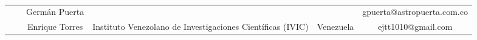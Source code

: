\begin{table}[H]
{\begin{tabular}{cccccc}
\multicolumn{1}{c|}{} & \multicolumn{1}{c|}{} & \multicolumn{1}{c|}{Germán Puerta} & \multicolumn{1}{c|}{} & \multicolumn{1}{c|}{} & \multicolumn{1}{c|}{gpuerta@astropuerta.com.co} \\ \cline{3-6} 
\multicolumn{1}{c|}{} & \multicolumn{1}{c|}{} & \multicolumn{1}{c|}{Enrique Torres} & \multicolumn{1}{c|}{Instituto Venezolano de Investigaciones Científicas (IVIC)} & \multicolumn{1}{c|}{Venezuela} & \multicolumn{1}{c|}{ejtt1010@gmail.com} \\ \cline{2-6} 
\end{tabular}
}
\caption{}
\label{tab:my-table}
\end{table}